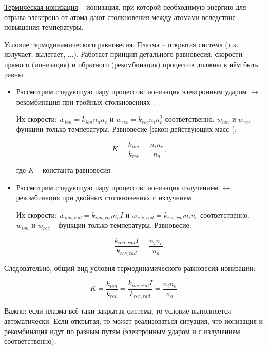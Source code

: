 \documentclass[10pt, a4paper]{article}
\numberwithin{equation}{section}
\begin{document}
\uline{Термическая ионизация} -- ионизация, при которой необходимую энергию для отрыва электрона от атома дают столкновения между атомами вследствие повышения температуры.

\uline{Условие термодинамического равновесия}. Плазма -- открытая система (т.к. излучает, вылетает, ...). Работает принцип детального равновесия: скорости прямого (ионизация) и обратного (рекомбинация) процессов должны в нём быть равны.

\begin{itemize}

\item Рассмотрим следующую пару процессов: ионизация электронным ударом $\leftrightarrow$ рекомбинация при тройных столкновениях~\cite{frank}.

Их скорости: $w_{ion} = k_{ion}n_an_e$ и $w_{rec} = k_{rec}n_in_e^2$ соответственно. $w_{ion}$ и $w_{rec}$ -- функции только температуры. Равновесие [закон действующих масс~\cite{frank}]:
 
\begin{equation} \label{eq:detailed_balance}
	K = \frac{k_{ion}}{k_{rec}} = \frac{n_in_e}{n_a},
\end{equation}

где $K$ -- константа равновесия. 

\item Рассмотрим следующую пару процессов: ионизация излучением $\leftrightarrow$ рекомбинация при двойных столкновениях с излучнием~\cite{frank}.

Их скорости: $w_{ion, rad} = k_{ion, rad}n_aI$ и $w_{rec, rad} = k_{rec, rad}n_in_e$ соответственно. $w_{ion}$ и $w_{rec}$ -- функции только температуры. Равновесие:

\begin{equation}
	\frac{k_{ion, rad}I}{k_{rec, rad}} = \frac{n_in_e}{n_a}.
\end{equation} 

\end{itemize}

Следовательно, общий вид условия термодинамического равновесия ионизации:

\begin{equation}
	K = \frac{k_{ion}}{k_{rec}} = \frac{k_{ion, rad}I}{k_{rec, rad}} = \frac{n_in_e}{n_a}
\end{equation}

Важно: если плазма всё-таки закрытая система, то условие выполняется автоматически. Если открытая, то может реализоваться ситуация, что ионизация и рекомбинация идут по разным путям (электронным ударом и с излучением соответственно). 
\end{document}
